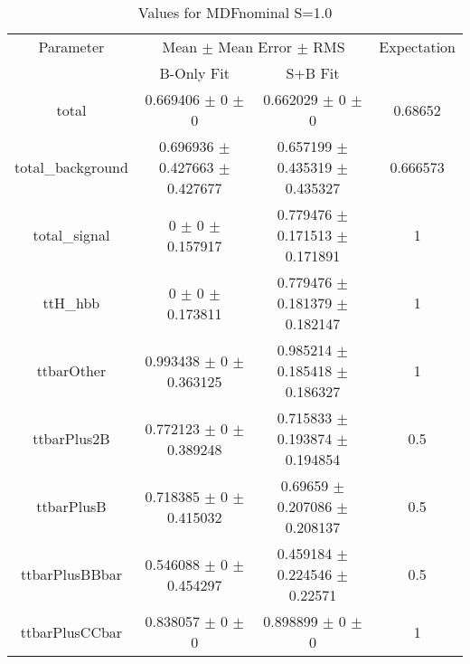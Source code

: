 \begin{table}
\centering
\caption{Values for MDFnominal S=1.0}
\begin{tabular}{cccc}
\toprule
Parameter & \multicolumn{2}{c}{Mean $\pm$ Mean Error $\pm$ RMS} & Expectation\\
 & B-Only Fit & S+B Fit & \\
\midrule
total & \num{0.669406} $\pm$ \num{0} $\pm$ \num{0} & \num{0.662029} $\pm$ \num{0} $\pm$ \num{0} & \num{0.68652}\\
total\_background & \num{0.696936} $\pm$ \num{0.427663} $\pm$ \num{0.427677} & \num{0.657199} $\pm$ \num{0.435319} $\pm$ \num{0.435327} & \num{0.666573}\\
total\_signal & \num{0} $\pm$ \num{0} $\pm$ \num{0.157917} & \num{0.779476} $\pm$ \num{0.171513} $\pm$ \num{0.171891} & \num{1}\\
ttH\_hbb & \num{0} $\pm$ \num{0} $\pm$ \num{0.173811} & \num{0.779476} $\pm$ \num{0.181379} $\pm$ \num{0.182147} & \num{1}\\
ttbarOther & \num{0.993438} $\pm$ \num{0} $\pm$ \num{0.363125} & \num{0.985214} $\pm$ \num{0.185418} $\pm$ \num{0.186327} & \num{1}\\
ttbarPlus2B & \num{0.772123} $\pm$ \num{0} $\pm$ \num{0.389248} & \num{0.715833} $\pm$ \num{0.193874} $\pm$ \num{0.194854} & \num{0.5}\\
ttbarPlusB & \num{0.718385} $\pm$ \num{0} $\pm$ \num{0.415032} & \num{0.69659} $\pm$ \num{0.207086} $\pm$ \num{0.208137} & \num{0.5}\\
ttbarPlusBBbar & \num{0.546088} $\pm$ \num{0} $\pm$ \num{0.454297} & \num{0.459184} $\pm$ \num{0.224546} $\pm$ \num{0.22571} & \num{0.5}\\
ttbarPlusCCbar & \num{0.838057} $\pm$ \num{0} $\pm$ \num{0} & \num{0.898899} $\pm$ \num{0} $\pm$ \num{0} & \num{1}\\
\bottomrule
\end{tabular}
\end{table}